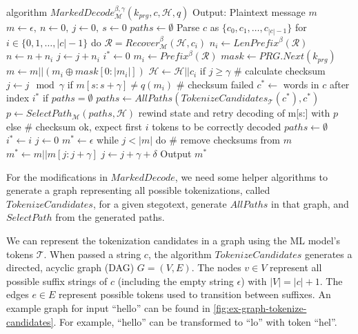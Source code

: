 \begin{Pseudocode}[caption={
Marked Decode Algorithm.
In comparison to Meteor's $Decode$ algorithm, MarkedDecode checks the checksum every $\gamma$ bits. 
If the checksum does not match, a decoding error happened.
We then perform a lookbehind on the stegotext and generate all possible tokenizations $paths$ for a substring of $c$.
Afterwards, rewind the internal state and retry decoding with a path $p$ selected from $paths$.
}, label={alg:marked-decode}]
algorithm $MarkedDecode_{\mathcal{M}}^{\beta,\gamma}(k_{prg}, c, \mathcal{H}, q)$
	Output: Plaintext message $m$
	$m \leftarrow \epsilon,~ n \leftarrow 0,~ j \leftarrow 0,~ s \leftarrow 0$
	$paths \leftarrow \emptyset$
	Parse $c$ as $\{ c_0, c_1, \dots, c_{|c|-1} \}$
	for $i \in \{0, 1, \dots, |c|-1 \}$ do
		$\mathcal{R} = Recover_{\mathcal{M}}^\beta(\mathcal{H}, c_i)$
		$n_i \leftarrow LenPrefix^\beta(\mathcal{R})$
		$n \leftarrow n + n_i$
		$j \leftarrow j + n_i$
		$i^* \leftarrow 0$
		$m_i \leftarrow Prefix^\beta(\mathcal{R})$
		$mask \leftarrow PRG.Next(k_{prg})$
		$m \leftarrow m || (m_i \oplus mask[0: |m_i|])$
		$\mathcal{H} \leftarrow \mathcal{H}||c_i$
		if $j \geq \gamma$
			# calculate checksum
			$j \leftarrow j \mod \gamma$
			if $m[s:s+\gamma] \neq q(m_i)$  # checksum failed
				$c^* \leftarrow$ words in $c$ after index $i^*$
				if $paths = \emptyset$
					$paths \leftarrow AllPaths(TokenizeCandidates_{\mathcal{T}}(c^*), c^*)$
				$p \leftarrow SelectPath_{\mathcal{M}}(paths, \mathcal{H})$
				rewind state and retry decoding of m[s:] with $p$
			else  # checksum ok, expect first $i$ tokens to be correctly decoded
				$paths \leftarrow \emptyset$
				$i^* \leftarrow i$
	$j \leftarrow 0$
	$m^* \leftarrow \epsilon$
	while $j < |m|$ do  # remove checksums from $m$
		$m^* \leftarrow m || m[j: j + \gamma]$
		$j \leftarrow j + \gamma + \delta$
	Output $m^*$
\end{Pseudocode}

For the modifications in $MarkedDecode$, we need some helper algorithms to generate a graph representing all possible tokenizations, called $TokenizeCandidates$, for a given stegotext, generate $AllPaths$ in that graph, and $SelectPath$ from the generated paths.

We can represent the tokenization candidates in a graph using the ML model's tokens $\mathcal{T}$.
When passed a string $c$, the algorithm $TokenizeCandidates$ generates a directed, acyclic graph (DAG) $G = (V, E)$.
The nodes $v \in V$ represent all possible suffix strings of $c$ (including the empty string $\epsilon$) with $|V| = |c| + 1$.
The edges $e \in E$ represent possible tokens used to transition between suffixes.
An example graph for input ``hello'' can be found in \autoref{fig:ex-graph-tokenize-candidates}.
For example, ``hello'' can be transformed to ``lo'' with token ``hel''.

